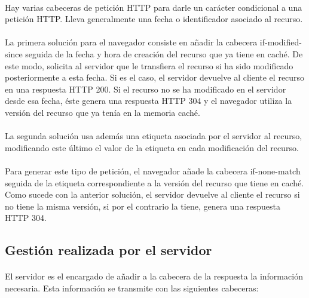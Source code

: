\documentclass{article}
\begin{document}
	\paragraph{}Hay varias cabeceras de petición HTTP para darle un carácter condicional a una petición HTTP. Lleva generalmente una fecha o identificador asociado al recurso.
	\paragraph{}La primera solución para el navegador consiste en añadir la cabecera if-modified-since seguida de la fecha y hora de creación del recurso que ya tiene en caché. De este modo, solicita al servidor que le transfiera el recurso si ha sido modificado posteriormente a esta fecha. Si es el caso, el servidor devuelve al cliente el recurso en una respuesta HTTP 200. Si el recurso no se ha modificado en el servidor desde esa fecha, éste genera una respuesta HTTP 304 y el navegador utiliza la versión del recurso que ya tenía en la memoria caché.
	
	\paragraph{}La segunda solución usa además una etiqueta asociada por el servidor al recurso, modificando este último el valor de la etiqueta en cada modificación del recurso.
	
	\paragraph{}Para generar este tipo de petición, el navegador añade la cabecera if-none-match seguida de la etiqueta correspondiente a la versión del recurso que tiene en caché. Como sucede con la anterior solución, el servidor devuelve al cliente el recurso si no tiene la misma versión, si por el contrario la tiene, genera una respuesta HTTP 304.
	
	\subsection{Gestión realizada por el servidor}
	
	\paragraph{}El servidor es el encargado de añadir a la cabecera de la respuesta la información necesaria. Esta información se transmite con las siguientes cabeceras:\\
	
\end{document}
